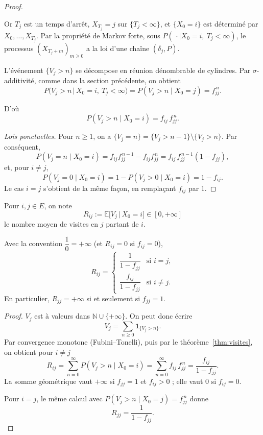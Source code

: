 \begin{proof}
\begin{itemize}
Or $T_j$ est un temps d'arrêt, $X_{T_j}=j$ sur $\{T_j<\infty\}$, et $\{X_0=i\}$ est déterminé par $X_0,\dots,X_{T_j}$. Par la propriété de Markov forte, sous $P(\,\cdot\mid X_0=i,\ T_j<\infty)$, le processus $(X_{T_j+m})_{m\ge0}$ a la loi d'une chaîne $(\delta_j,P)$.

L'événement $\{V_j>n\}$ se décompose en réunion dénombrable de cylindres. Par $\sigma$-additivité, comme dans la section précédente, on obtient
\[
P\big(V_j>n\,\big|\,X_0=i,\ T_j<\infty\big)=P(V_j>n\mid X_0=j)=f_{jj}^{\,n}.
\]
\end{itemize}
D'où
\[
P(V_j>n\mid X_0=i)=f_{ij}\,f_{jj}^{\,n}.
\]

\emph{Lois ponctuelles.} Pour $n\ge1$, on a $\{V_j=n\}=\{V_j>n-1\}\setminus\{V_j>n\}$. Par conséquent,
\[
P(V_j=n\mid X_0=i)=f_{ij}f_{jj}^{\,n-1}-f_{ij}f_{jj}^{\,n}=f_{ij}\,f_{jj}^{\,n-1}(1-f_{jj}),
\]
et, pour $i\neq j$,
\[
P(V_j=0\mid X_0=i)=1-P(V_j>0\mid X_0=i)=1-f_{ij}.
\]
Le cas $i=j$ s'obtient de la même façon, en remplaçant $f_{ij}$ par $1$.
\end{proof}

\begin{definition}
Pour $i,j\in E$, on note
\[
R_{ij}:=\mathbb E\big[V_j\,\big|\,X_0=i\big]\in[0,+\infty]
\]
le nombre moyen de visites en $j$ partant de $i$.
\end{definition}

\begin{proposition}
Avec la convention $\dfrac{1}{0}=+\infty$ (et $R_{ij}=0$ si $f_{ij}=0$),
\[
R_{ij}=
\begin{cases}
\dfrac{1}{1-f_{jj}} & \text{si } i=j,\\[10pt]
\dfrac{f_{ij}}{1-f_{jj}} & \text{si } i\neq j.
\end{cases}
\]
En particulier, $R_{jj}=+\infty$ si et seulement si $f_{jj}=1$.
\end{proposition}

\begin{proof}
$V_j$ est à valeurs dans $\mathbb N\cup\{+\infty\}$. On peut donc écrire
\[
V_j=\sum_{n\ge0}\mathbf 1_{\{V_j>n\}}.
\]
Par convergence monotone (Fubini--Tonelli), puis par le théorème~\ref{thm:visites}, on obtient pour $i\neq j$
\[
R_{ij}=\sum_{n=0}^{\infty}P(V_j>n\mid X_0=i)
=\sum_{n=0}^{\infty}f_{ij}\,f_{jj}^{\,n}
=\frac{f_{ij}}{1-f_{jj}}.
\]
La somme géométrique vaut $+\infty$ si $f_{jj}=1$ et $f_{ij}>0$ ; elle vaut $0$ si $f_{ij}=0$.

Pour $i=j$, le même calcul avec $P(V_j>n\mid X_0=j)=f_{jj}^{\,n}$ donne
\[
R_{jj}=\frac{1}{1-f_{jj}}.
\]
\end{proof}

